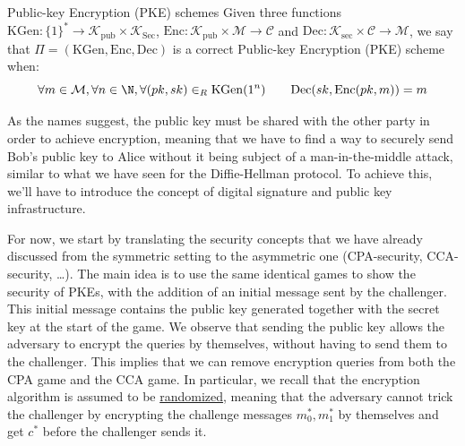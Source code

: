 \documentclass[a4paper, 12pt]{report}
\begin{document}
    \begin{frameddefn}{Public-key Encryption (PKE) schemes}
        Given three functions $\mathrm{KGen} : \{1\}^* \to \mathcal{K}_{\mathrm{pub}} \times \mathcal{K}_\mathrm{Sec}$, $\mathrm{Enc} : \mathcal{K}_{\mathrm{pub}} \times \mathcal{M} \to \mathcal{C}$ and $\mathrm{Dec} : \mathcal{K}_{\mathrm{sec}} \times \mathcal{C} \to \mathcal{M}$, we say that $\Pi = (\mathrm{KGen}, \mathrm{Enc}, \mathrm{Dec})$ is a correct Public-key Encryption (PKE) scheme when:
        \[\forall m \in \mathcal{M}, \forall n \in \N, \forall (pk,sk) \in_R \mathrm{KGen}(1^n) \qquad \mathrm{Dec}(sk, \mathrm{Enc}(pk, m)) = m\]
    \end{frameddefn}

    As the names suggest, the public key must be shared with the other party in order to achieve encryption, meaning that we have to find a way to securely send Bob's public key to Alice without it being subject of a man-in-the-middle attack, similar to what we have seen for the Diffie-Hellman protocol. To achieve this, we'll have to introduce the concept of digital signature and public key infrastructure.

    For now, we start by translating the security concepts that we have already discussed from the symmetric setting to the asymmetric one (CPA-security, CCA-security, \dots). The main idea is to use the same identical games to show the security of PKEs, with the addition of an initial message sent by the challenger. This initial message contains the public key generated together with the secret key at the start of the game. We observe that sending the public key allows the adversary to encrypt the queries by themselves, without having to send them to the challenger. This implies that we can remove encryption queries from both the CPA game and the CCA game. In particular, we recall that the encryption algorithm is assumed to be \underline{randomized}, meaning that the adversary cannot trick the challenger by encrypting the challenge messages $m_0^*, m_1^*$ by themselves and get $c^*$ before the challenger sends it. 
\end{document}
